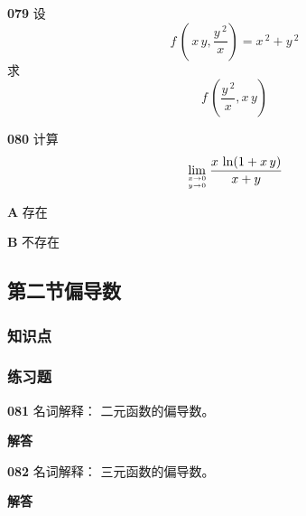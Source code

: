 \documentclass[a4paper,10pt]{article} %
\begin{document}
\par\noindent \textbf{079} \quad 设
$$f\,\left(\,x\,y, \frac{y\,^2}{x}\right)=x\,^2+y\,^2$$ 
求
$$f\,\left(\frac{y\,^2}{x},x\,y\right)$$





\textheight


\par\noindent \textbf{080} \quad 计算
$$\lim_{x\to 0 \atop y\to 0} \frac{x\,\ln(1+x\,y)}{x+y}$$
\par\noindent \textbf{A} \quad 存在
\par\noindent \textbf{B} \quad 不存在








\textheight


\newpage
\subsection{第二节\quad 偏导数}
\subsubsection{知识点}
\subsubsection{练习题}
\par\noindent \textbf{081} \quad 名词解释： 二元函数的偏导数。
\par\noindent \textbf{ 解答}





\textheight


\par\noindent \textbf{082} \quad 名词解释： 三元函数的偏导数。
\par\noindent \textbf{ 解答}





\textheight
\end{document}
